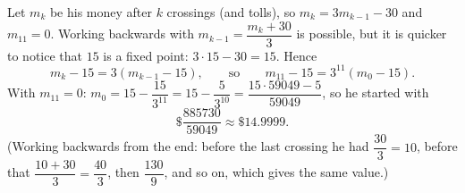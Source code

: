 Let $m_k$ be his money after $k$ crossings (and tolls), so $m_k=3m_{k-1}-30$ and $m_{11}=0$. Working backwards with $m_{k-1}=\dfrac{m_k+30}{3}$ is possible, but it is quicker to notice that $15$ is a fixed point: $3\cdot15-30=15$. Hence
\[
m_k-15=3(m_{k-1}-15),\qquad\text{so}\qquad m_{11}-15=3^{11}(m_0-15).
\]
With $m_{11}=0$: $m_0=15-\dfrac{15}{3^{11}}=15-\dfrac{5}{3^{10}}=\dfrac{15\cdot59049-5}{59049}$, so he started with
\[
\boxed{\$\dfrac{885730}{59049}}\approx\$14.9999 .
\]
(Working backwards from the end: before the last crossing he had $\dfrac{30}{3}=10$, before that $\dfrac{10+30}{3}=\dfrac{40}{3}$, then $\dfrac{130}{9}$, and so on, which gives the same value.)
